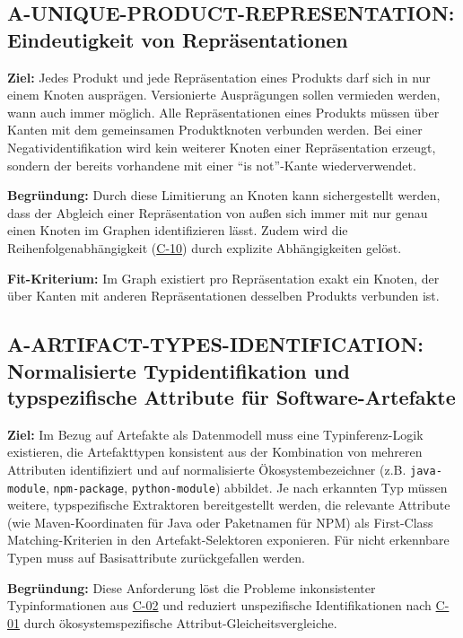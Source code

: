 \subsection{A-UNIQUE-PRODUCT-REPRESENTATION: Eindeutigkeit von Repräsentationen}\label{subsec:req-unique-product-representations}

\textbf{Ziel:}
Jedes Produkt und jede Repräsentation eines Produkts darf sich in nur einem Knoten ausprägen.
Versionierte Ausprägungen sollen vermieden werden, wann auch immer möglich.
Alle Repräsentationen eines Produkts müssen über Kanten mit dem gemeinsamen Produktknoten verbunden werden.
Bei einer Negatividentifikation wird kein weiterer Knoten einer Repräsentation erzeugt, sondern der bereits vorhandene mit einer \enquote{is not}-Kante wiederverwendet.

\textbf{Begründung:}
Durch diese Limitierung an Knoten kann sichergestellt werden, dass der Abgleich einer Repräsentation von außen sich immer mit nur genau einen Knoten im Graphen identifizieren lässt.
Zudem wird die Reihenfolgenabhängigkeit (\hyperref[subsec:c-10-order-dependency]{C-10}) durch explizite Abhängigkeiten gelöst.

\textbf{Fit-Kriterium:}
Im Graph existiert pro Repräsentation exakt ein Knoten, der über Kanten mit anderen Repräsentationen desselben Produkts verbunden ist.

\subsection{A-ARTIFACT-TYPES-IDENTIFICATION: Normalisierte Typidentifikation und typspezifische Attribute für Software-Artefakte}\label{subsec:req-type-specific-matching}

\textbf{Ziel:}
Im Bezug auf Artefakte als Datenmodell muss eine Typinferenz-Logik existieren, die Artefakttypen konsistent aus der Kombination von mehreren Attributen identifiziert und auf normalisierte Ökosystembezeichner (z.B. \texttt{java-module}, \texttt{npm-package}, \texttt{python-module}) abbildet.
Je nach erkannten Typ müssen weitere, typspezifische Extraktoren bereitgestellt werden, die relevante Attribute (wie Maven-Koordinaten für Java oder Paketnamen für NPM) als First-Class Matching-Kriterien in den Artefakt-Selektoren exponieren.
Für nicht erkennbare Typen muss auf Basisattribute zurückgefallen werden.

\textbf{Begründung:}
Diese Anforderung löst die Probleme inkonsistenter Typinformationen aus \hyperref[subsec:c-02-uneindeutige-artefakt-typinformation]{C-02} und reduziert unspezifische Identifikationen nach \hyperref[subsec:c-01-unspezifische-identifikation-von-artefakten]{C-01} durch ökosystemspezifische Attribut-Gleicheitsvergleiche.

